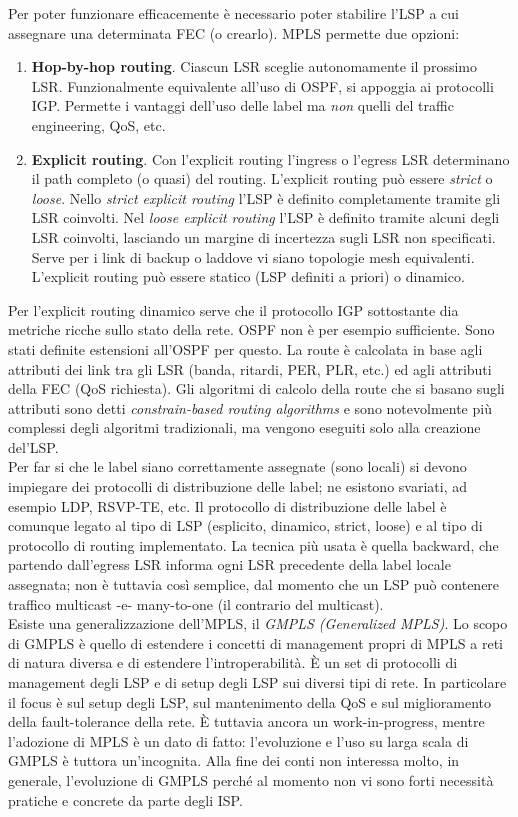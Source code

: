 Per poter funzionare efficacemente è necessario poter stabilire l'LSP a cui assegnare una determinata FEC (o crearlo). MPLS permette due opzioni:
\begin{enumerate}
	\item \textbf{Hop-by-hop routing}. Ciascun LSR sceglie autonomamente il prossimo LSR. Funzionalmente equivalente all'uso di OSPF, si appoggia ai protocolli IGP. Permette i vantaggi dell'uso delle label ma \textit{non} quelli del traffic engineering, QoS, etc.
	\item \textbf{Explicit routing}. Con l'explicit routing l'ingress o l'egress LSR determinano il path completo (o quasi) del routing. L'explicit routing può essere \textit{strict} o \textit{loose}. Nello \textit{strict explicit routing} l'LSP è definito completamente tramite gli LSR coinvolti. Nel \textit{loose explicit routing} l'LSP è definito tramite alcuni degli LSR coinvolti, lasciando un margine di incertezza sugli LSR non specificati. Serve per i link di backup o laddove vi siano topologie mesh equivalenti. L'explicit routing può essere statico (LSP definiti a priori) o dinamico.
\end{enumerate}
Per l'explicit routing dinamico serve che il protocollo IGP sottostante dia metriche ricche sullo stato della rete. OSPF non è per esempio sufficiente. Sono stati definite estensioni all'OSPF per questo. La route è calcolata in base agli attributi dei link tra gli LSR (banda, ritardi, PER, PLR, etc.) ed agli attributi della FEC (QoS richiesta). Gli algoritmi di calcolo della route che si basano sugli attributi sono detti \textit{constrain-based routing algorithms} e sono notevolmente più complessi degli algoritmi tradizionali, ma vengono eseguiti solo alla creazione del'LSP.\\
Per far si che le label siano correttamente assegnate (sono locali) si devono impiegare dei protocolli di distribuzione delle label; ne esistono svariati, ad esempio LDP, RSVP-TE, etc. Il protocollo di distribuzione delle label è comunque legato al tipo di LSP (esplicito, dinamico, strict, loose) e al tipo di protocollo di routing implementato. La tecnica più usata è quella backward, che partendo dall'egress LSR informa ogni LSR precedente della label locale assegnata; non è tuttavia così semplice, dal momento che un LSP può contenere traffico multicast -e- many-to-one (il contrario del multicast).\\
Esiste una generalizzazione dell'MPLS, il \textit{GMPLS (Generalized MPLS)}. Lo scopo di GMPLS è quello di estendere i concetti di management propri di MPLS a reti di natura diversa e di estendere l'introperabilità. È un set di protocolli di management degli LSP e di setup degli LSP sui diversi tipi di rete. In particolare il focus è sul setup degli LSP, sul mantenimento della QoS e sul miglioramento della fault-tolerance della rete. È tuttavia ancora un work-in-progress, mentre l'adozione di MPLS è un dato di fatto: l'evoluzione e l'uso su larga scala di GMPLS è tuttora un'incognita. Alla fine dei conti non interessa molto, in generale, l'evoluzione di GMPLS perché al momento non vi sono forti necessità pratiche e concrete da parte degli ISP.


